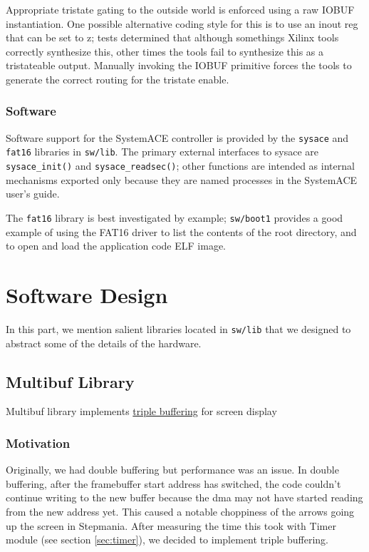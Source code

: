 \documentclass[10pt]{report}
\begin{document}
Appropriate tristate gating to the outside world is enforced using a raw
IOBUF instantiation. One possible alternative coding style for this is to
use an inout reg that can be set to z; tests determined that although
somethings Xilinx tools correctly synthesize this, other times the tools
fail to synthesize this as a tristateable output. Manually invoking the
IOBUF primitive forces the tools to generate the correct routing for the
tristate enable.

\subsection{Software}

Software support for the SystemACE controller is provided by the
\texttt{sysace} and \texttt{fat16} libraries in \texttt{sw/lib}.  The
primary external interfaces to sysace are \texttt{sysace\_init()} and
\texttt{sysace\_readsec()}; other functions are intended as internal
mechanisms exported only because they are named processes in the SystemACE
user's guide.

The \texttt{fat16} library is best investigated by example;
\texttt{sw/boot1} provides a good example of using the FAT16 driver to list
the contents of the root directory, and to open and load the application
code ELF image.

\chapter{Software Design}

In this part, we mention salient libraries located in \texttt{sw/lib} that we 
designed to abstract some of the details of the hardware.

\section{Multibuf Library}

\label{sec:multibuf}

Multibuf library implements \href{http://en.wikipedia.org/wiki/Multiple_buffering#Triple_buffering}{triple buffering} for screen display 

\subsection{Motivation}

Originally, we had double buffering but performance was an issue. In double buffering, after the framebuffer start address has switched, the code couldn't continue writing to the new buffer because the dma may not have started reading from the new address yet. This caused a notable choppiness of the arrows going up the screen in Stepmania. After measuring the time this took with Timer module (see section \ref{sec:timer}), we decided to implement triple buffering. 
\end{document}
